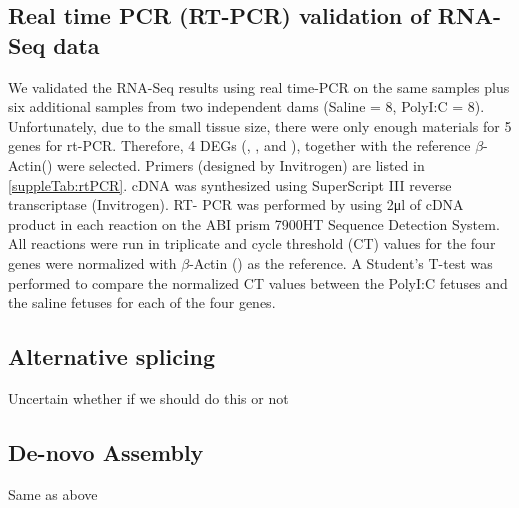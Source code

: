 \subsection{Real time PCR (RT-PCR) validation of RNA-Seq data}
We validated the RNA-Seq results using real time-PCR on the same samples plus six additional samples from two independent dams (Saline = 8, PolyI:C = 8).
Unfortunately, due to the small tissue size, there were only enough materials for 5 genes for rt-PCR. 
Therefore, 4 DEGs (, ,  and ), together with the reference $\beta$-Actin() were selected. 
Primers (designed by Invitrogen) are listed in \ref{suppleTab:rtPCR}. 
cDNA was synthesized using SuperScript III reverse transcriptase (Invitrogen). 
RT- PCR was performed by using 2μl of cDNA product in each reaction on the ABI prism 7900HT Sequence Detection System.
All reactions were run in triplicate and cycle threshold (CT) values for the four genes were normalized with $\beta$-Actin () as the reference. 
A Student’s T-test was performed to compare the normalized CT values between the PolyI:C fetuses and the saline fetuses for each of the four genes\cite{Yuan2006}.


\subsection{Alternative splicing}
Uncertain whether if we should do this or not
\subsection{De-novo Assembly} 
Same as above
